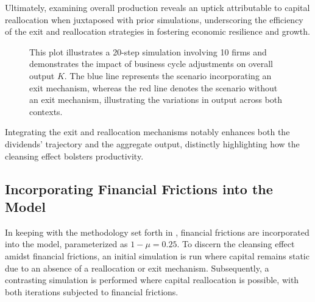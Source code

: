 \documentclass[12pt]{article}
\begin{document}
Ultimately, examining overall production reveals an uptick attributable to capital reallocation when juxtaposed with
prior simulations, underscoring the efficiency of the exit and reallocation strategies in fostering economic resilience
and growth.


\begin{figure}[H]
    \centering
    \caption{This plot illustrates a 20-step simulation involving 10 firms and demonstrates the impact of business cycle
    adjustments on overall output \( K \). The blue line represents the scenario incorporating an exit mechanism, whereas
    the red line denotes the scenario without an exit mechanism, illustrating the variations in output across both
     contexts.}
    \label{fig:OutExit}
\end{figure}

Integrating the exit and reallocation mechanisms notably enhances both the dividends' trajectory and the aggregate
output, distinctly highlighting how the cleansing effect bolsters productivity. 


\subsection{Incorporating Financial Frictions into the Model}


In keeping with the methodology set forth in \cite{OsePap17}, financial frictions are incorporated into the model,
parameterized as  \(1-\mu = 0.25\). To discern the cleansing effect amidst financial frictions, an initial simulation is
run where capital remains static due to an absence of a reallocation or exit mechanism. Subsequently, a contrasting
simulation is performed where capital reallocation is possible, with both iterations subjected to financial frictions.
\end{document}
